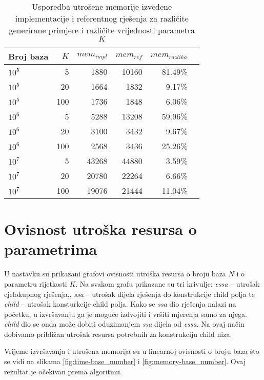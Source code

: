 \documentclass[times, utf8, seminar, numeric]{fer}
\begin{document}
\begin{table}[h]
	\centering
	\caption{Usporedba utrošene memorije izvedene implementacije i referentnog rješenja za različite generirane primjere i različite vrijednosti parametra $K$}
	\label{tbl:memory-generated}
	
	\begin{tabular}{lrrrrr}
		\hline
        Broj baza & $K$ & $mem_{impl}$ & $mem_{ref}$ & $mem_{razlika}$ \\ \hline
        $10^5$ & 5 & 1880 & 10160 & 81.49\% \\
        $10^5$ & 20 & 1664 & 1832 & 9.17\% \\
        $10^5$ & 100 & 1736 & 1848 & 6.06\% \\ \hline
        $10^6$ & 5 & 5288 & 13208 & 59.96\% \\
        $10^6$ & 20 & 3100 & 3432 & 9.67\% \\
        $10^6$ & 100 & 2568 & 3436 & 25.26\% \\ \hline
        $10^7$ & 5 & 43268 & 44880 & 3.59\% \\
        $10^7$ & 20 & 20780 & 22264 & 6.66\% \\
        $10^7$ & 100 & 19076 & 21444 & 11.04\% \\
    \hline
	\end{tabular}
\end{table}

\section{Ovisnost utroška resursa o parametrima}
\label{sec:graph}

U nastavku su prikazani grafovi ovisnosti utroška resursa o broju baza $N$ i o parametru rijetkosti $K$. Na svakom grafu prikazane su tri krivulje: \textit{essa} -- utrošak cjelokupnog rješenja,, \textit{ssa} -- utrošak dijela rješenja do konstrukcije child polja te \textit{child} -- utrošak konsturkcije child polja. Kako se \textit{ssa} dio rješenja nalazi na početku, u izvršavanju ga je moguće izdvojiti i vršiti mjerenja samo za njega. \textit{child} dio se onda može dobiti oduzimanjem \textit{ssa} dijela od \textit{essa}. Na ovaj način dobivamo približan utrošak resursa potrebnih za konstrukciju child niza.

Vrijeme izvršavanja i utrošena memorija su u linearnoj ovisnosti o broju baza što se vidi na slikama \ref{fig:time-base_number} i \ref{fig:memory-base_number}. Ovaj rezultat je očekivan prema algoritmu.
\end{document}

